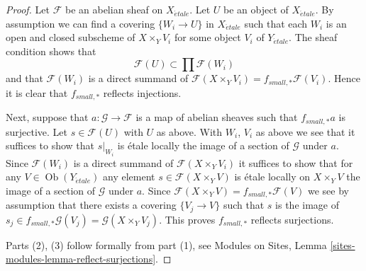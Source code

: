 \documentclass[10pt,a4paper]{amsart}
\theoremstyle{plain}
\theoremstyle{definition}
\theoremstyle{remark}
\numberwithin{equation}{subsection}
\def\Ob{\mathop{\mathrm{Ob}}\nolimits}
\def\etale{{\acute{e}tale}}
\begin{document}
\begin{proof}
Let $\mathcal{F}$ be an abelian sheaf on $X_\etale$.
Let $U$ be an object of $X_\etale$. By assumption we can find a
covering $\{W_i \to U\}$ in $X_\etale$ such that each $W_i$ is
an open and closed subscheme of $X \times_Y V_i$ for some object
$V_i$ of $Y_\etale$. The sheaf condition shows that
$$
\mathcal{F}(U) \subset \prod \mathcal{F}(W_i)
$$
and that $\mathcal{F}(W_i)$ is a direct summand of
$\mathcal{F}(X \times_Y V_i) = f_{small, *}\mathcal{F}(V_i)$.
Hence it is clear that $f_{small, *}$ reflects injections.

\medskip\noindent
Next, suppose that $a : \mathcal{G} \to \mathcal{F}$ is a map of
abelian sheaves such that $f_{small, *}a$ is surjective. Let
$s \in \mathcal{F}(U)$ with $U$ as above. With $W_i$, $V_i$ as
above we see that it suffices to show that $s|_{W_i}$ is \'etale locally
the image of a section of $\mathcal{G}$ under $a$. Since $\mathcal{F}(W_i)$
is a direct summand of $\mathcal{F}(X \times_Y V_i)$
it suffices to show that for any $V \in \Ob(Y_\etale)$
any element $s \in \mathcal{F}(X \times_Y V)$
is \'etale locally on $X \times_Y V$ the image of a section of
$\mathcal{G}$ under $a$. Since
$\mathcal{F}(X \times_Y V) = f_{small, *}\mathcal{F}(V)$
we see by assumption that there exists a covering $\{V_j \to V\}$ such that
$s$ is the image of
$s_j \in f_{small, *}\mathcal{G}(V_j) = \mathcal{G}(X \times_Y V_j)$.
This proves $f_{small, *}$ reflects surjections.

\medskip\noindent
Parts (2), (3) follow formally from part (1), see
Modules on Sites, Lemma \ref{sites-modules-lemma-reflect-surjections}.
\end{proof}
\end{document}
